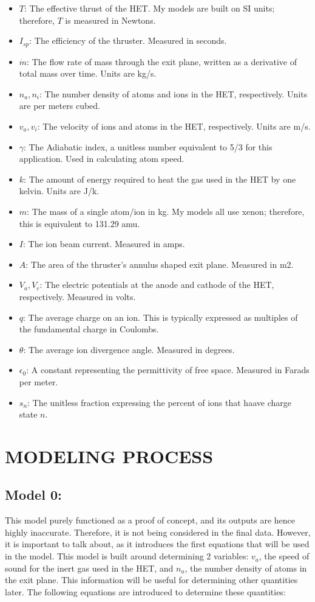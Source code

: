 \documentclass[letterpaper, 10 pt, conference]{ieeeconf}  %
\begin{document}
\begin{itemize}
    \item $T$: The effective thrust of the HET. My models are built on SI units; therefore, $T$ is measured in Newtons.
	\item $I_{sp}$: The efficiency of the thruster. Measured in seconds.
	\item $\dot{m}$: The flow rate of mass through the exit plane, written as a derivative of total mass over time. Units are kg/s.
	\item $n_a, n_i$: The number density of atoms and ions in the HET, respectively. Units are per meters cubed.
	\item $v_a, v_i$: The velocity of ions and atoms in the HET, respectively. Units are m/s.
	\item $\gamma$: The Adiabatic index, a unitless number equivalent to 5/3 for this application. Used in calculating atom speed.
	\item $k$: The amount of energy required to heat the gas used in the HET by one kelvin. Units are J/k.
	\item $m$: The mass of a single atom/ion in kg. My models all use xenon; therefore, this is equivalent to 131.29 amu.
	\item $I$: The ion beam current. Measured in amps.
	\item $A$: The area of the thruster’s annulus shaped exit plane. Measured in m2.
	\item $V_a, V_c$: The electric potentials at the anode and cathode of the HET, respectively. Measured in volts.
	\item $q$: The average charge on an ion. This is typically expressed as multiples of the fundamental charge in Coulombs.
	\item $\theta$: The average ion divergence angle. Measured in degrees.
	\item $\epsilon_0$: A constant representing the permittivity of free space. Measured in Farads per meter.
    \item $s_n$: The unitless fraction expressing the percent of ions that haave charge state $n$.
\end{itemize}

\section{MODELING PROCESS}

\subsection{Model 0:}
This model purely functioned as a proof of concept, and its outputs are hence highly inaccurate. Therefore, it is not being considered in the final data. However, it is important to talk about, as it introduces the first equations that will be used in the model. This model is built around determining 2 variables: $v_a$, the speed of sound for the inert gas used in the HET, and $n_a$, the number density of atoms in the exit plane. This information will be useful for determining other quantities later. The following equations are introduced to determine these quantities:
\end{document}
